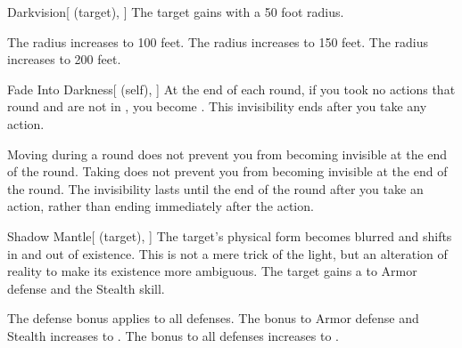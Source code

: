\lowercase{\hypertarget{spell:Darkvision}{}}\label{spell:Darkvision}
\begin{attuneability}[Rank 1]{\hypertarget{spell:Darkvision}{Darkvision}}[ (target), ]
The target gains  with a 50 foot radius.

\rankline
{} The radius increases to 100 feet.
 The radius increases to 150 feet.
 The radius increases to 200 feet.
\end{attuneability}
\vspace{0.25em}



\lowercase{\hypertarget{spell:Fade Into Darkness}{}}\label{spell:Fade Into Darkness}
\begin{attuneability}[Rank 1]{\hypertarget{spell:Fade Into Darkness}{Fade Into Darkness}}[ (self), ]
At the end of each round, if you took no actions that round and are not in , you become .
This invisibility ends after you take any action.

\rankline
{} Moving during a round does not prevent you from becoming invisible at the end of the round.
 Taking  does not prevent you from becoming invisible at the end of the round.
 The invisibility lasts until the end of the round after you take an action, rather than ending immediately after the action.
\end{attuneability}
\vspace{0.25em}



\lowercase{\hypertarget{spell:Shadow Mantle}{}}\label{spell:Shadow Mantle}
\begin{attuneability}[Rank 1]{\hypertarget{spell:Shadow Mantle}{Shadow Mantle}}[ (target), ]
The target's physical form becomes blurred and shifts in and out of existence.
This is not a mere trick of the light, but an alteration of reality to make its existence more ambiguous.
The target gains a   to Armor defense and the Stealth skill.

\rankline
{} The defense bonus applies to all defenses.
 The bonus to Armor defense and Stealth increases to .
 The bonus to all defenses increases to .
\end{attuneability}
\vspace{0.25em}



